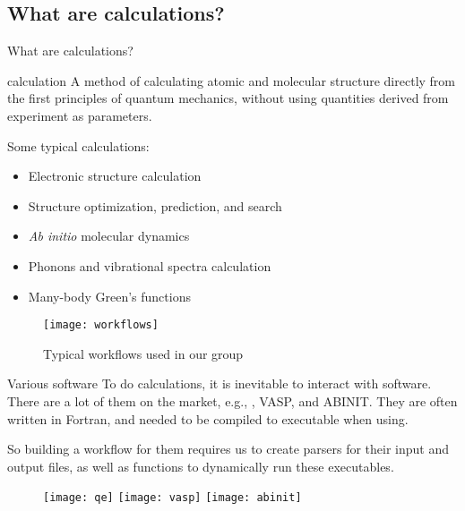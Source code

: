\subsection{What are \ab{} calculations?}

\begin{frame}[allowframebreaks]{What are \ab{} calculations?}
    \begin{definitionblock}{\ab{} calculation}
        A method of calculating atomic and molecular structure directly from the first
        principles of quantum mechanics, without using quantities derived from experiment
        as parameters.
    \end{definitionblock}

    Some typical \ab{} calculations:
    \begin{itemize}
        \item Electronic structure calculation
        \item Structure optimization, prediction, and search
        \item \textit{Ab initio} molecular dynamics
        \item Phonons and vibrational spectra calculation
        \item Many-body Green's functions
    \end{itemize}

    \framebreak

    \begin{figure}[H]
        \centering
        \texttt{[image: workflows]}
        \caption{Typical \ab{} workflows used in our group}
        \label{eq:workflows}
    \end{figure}
\end{frame}

\begin{frame}{Various \ab{} software}
    To do \ab{} calculations, it is inevitable to interact with \ab{} software.
    There are a lot of them on the market, e.g., \qe{}, VASP, and ABINIT.
    They are often written in Fortran, and needed to be compiled to executable
    when using.

    So building a workflow for them requires us to create parsers for their input and output
    files, as well as functions to dynamically run these executables.

    \begin{figure}[b]
        \centering
        \texttt{[image: qe]}
        \hfill
        \texttt{[image: vasp]}
        \hfill
        \texttt{[image: abinit]}
        \label{fig:abinitsoftware}
    \end{figure}
\end{frame}
